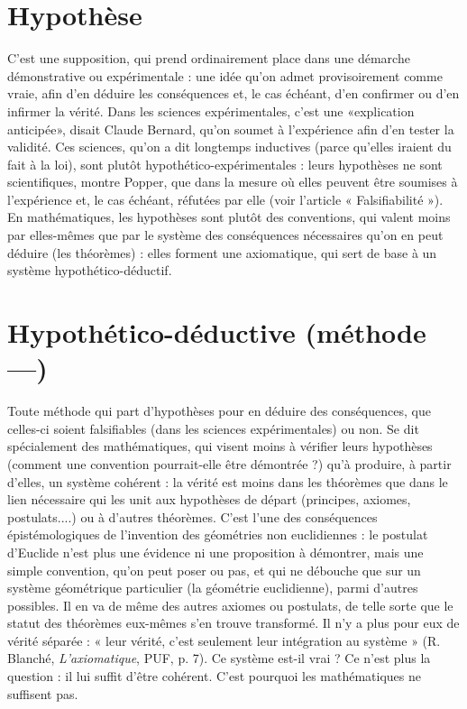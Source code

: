 \section{Hypothèse}
C’est une supposition, qui prend ordinairement place dans
une démarche démonstrative ou expérimentale : une idée
qu’on admet provisoirement comme vraie, afin d’en déduire les conséquences
et, le cas échéant, d’en confirmer ou d’en infirmer la vérité. Dans les sciences
expérimentales, c’est une «explication anticipée», disait Claude Bernard,
qu’on soumet à l'expérience afin d’en tester la validité. Ces sciences, qu’on a dit
longtemps inductives (parce qu’elles iraient du fait à la loi), sont plutôt
hypothético-expérimentales : leurs hypothèses ne sont scientifiques, montre Popper,
que dans la mesure où elles peuvent être soumises à l’expérience et, le cas
échéant, réfutées par elle (voir l’article « Falsifiabilité »). En mathématiques, les
hypothèses sont plutôt des conventions, qui valent moins par elles-mêmes que
par le système des conséquences nécessaires qu'on en peut déduire (les
théorèmes) : elles forment une axiomatique, qui sert de base à un système
hypothético-déductif.

\section{Hypothético-déductive (méthode —)}
Toute méthode qui part
d’hypothèses pour en
déduire des conséquences, que celles-ci soient falsifiables (dans les sciences
expérimentales) ou non. Se dit spécialement des mathématiques, qui visent
moins à vérifier leurs hypothèses (comment une convention pourrait-elle être
démontrée ?) qu’à produire, à partir d’elles, un système cohérent : la vérité est
moins dans les théorèmes que dans le lien nécessaire qui les unit aux hypothèses
de départ (principes, axiomes, postulats....) ou à d’autres théorèmes. C’est l’une
des conséquences épistémologiques de l'invention des géométries non euclidiennes :
le postulat d’Euclide n’est plus une évidence ni une proposition à
démontrer, mais une simple convention, qu’on peut poser ou pas, et qui ne
débouche que sur un système géométrique particulier (la géométrie euclidienne),
parmi d’autres possibles. Il en va de même des autres axiomes ou postulats,
de telle sorte que le statut des théorèmes eux-mêmes s’en trouve transformé.
Il n’y a plus pour eux de vérité séparée : « leur vérité, c’est seulement
leur intégration au système » (R. Blanché, {\it L'axiomatique}, PUF, p. 7). Ce système
est-il vrai ? Ce n’est plus la question : il lui suffit d’être cohérent. C’est
pourquoi les mathématiques ne suffisent pas.

